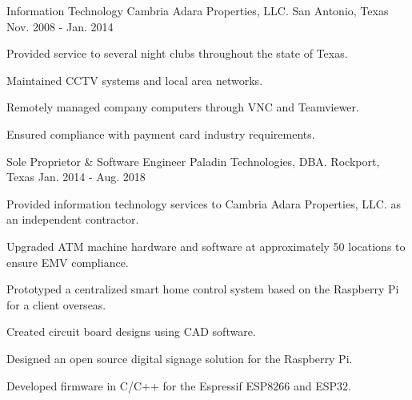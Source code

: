 

\begin{cventries}

  \cventry
    {Information Technology} %
    {Cambria Adara Properties, LLC.} %
    {San Antonio, Texas} %
    {Nov. 2008 - Jan. 2014} %
    {
      \begin{cvitems} %
        \item {
			Provided service to several night clubs throughout the
			state of Texas.
		}
        \item {
			Maintained CCTV systems and local area networks.
		}
		\item {
			Remotely managed company computers through VNC and
			Teamviewer.
		}
		\item {
			Ensured compliance with payment card industry
			requirements.
		}
      \end{cvitems}
    }

  \cventry
    {Sole Proprietor \& Software Engineer} %
    {Paladin Technologies, DBA.} %
    {Rockport, Texas} %
    {Jan. 2014 - Aug. 2018} %
    {
      \begin{cvitems} %
        \item {
			Provided information technology services to Cambria
			Adara Properties, LLC. as an independent contractor.
		}
        \item {
			Upgraded ATM machine hardware and software at approximately
			50 locations to ensure EMV compliance.
		}
        \item {
			Prototyped a centralized smart home control system
			based on the Raspberry Pi for a client overseas.
		}
        \item {
			Created circuit board designs using CAD software.
		}
        \item {
			Designed an open source digital signage solution
			for the Raspberry Pi.
		}
        \item {
			Developed firmware in C/C++ for the Espressif
			ESP8266 and ESP32.
		}
      \end{cvitems}
    }
\end{cventries}


\begin{cvskills}
\end{cvskills}

